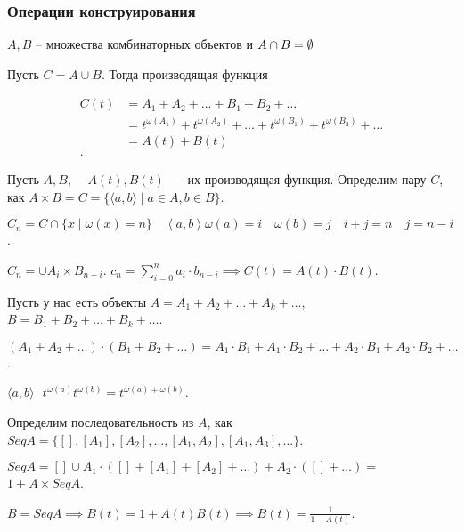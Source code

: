 \subsubsection*{Операции конструирования}
\begin{definition}

    $A, B$ -- множества комбинаторных объектов и $A\cap B = \emptyset $

    Пусть $C = A\cup B$. Тогда производящая функция

    \begin{align*}
    C(t) &= A_1 + A_2 + \ldots + B_1 + B_2 + \ldots \\
        &= t^{\omega(A_1)} + t^{\omega(A_2)} + \ldots + t^{\omega(B_1)} + t^{\omega(B_2)} + \ldots \\
        &= A(t) + B(t) \\
    .\end{align*}
\end{definition}

\begin{definition}

    Пусть $A, B$,~~ $A(t), B(t)$~--- их производящая функция. Определим пару $C$, как $A \times B = C = \{ \langle a, b \rangle \mid a \in A, b\in B \}$.

    $C_n = C \cap \{x \mid \omega(x) = n\}\quad \left<a, b \right> \omega(a) = i\quad \omega(b) = j\quad i + j = n\quad j = n-i$.

    $C_n = \cup A_i \times B_{n-i}$. $c_n = \sum_{i=0}^n a_i \cdot b_{n-i} \implies C(t) = A(t) \cdot B(t)$.
\end{definition}

\begin{note}
    Пусть у нас есть объекты $A = A_1 + A_2 + \ldots + A_k + \ldots$,\quad    $B = B_1 + B_2 + \ldots + B_k + \ldots$.

    $\left( A_1 + A_2 + \dots \right) \cdot\left( B_1 +B_2 +\dots  \right) = A_1 \cdot B_1 + A_1 \cdot B_2 + \ldots + A_2 \cdot B_1 + A_2 \cdot B_2 + \ldots $.

    $\langle a, b \rangle ~~~ t^{\omega(a)} t ^{\omega (b)} = t ^{\omega (a) + \omega (b)}$.
\end{note}

\begin{definition}
    Определим последовательность из $A$, как $Seq A = \{ [], [A_1], [A_2], \ldots, [A_1, A_2], [A_1, A_3], \ldots\}$.

    $Seq A =  [] \cup A_1 \cdot \left( [] + [A_1] + [A_2] + \dots\right) + A_2 \cdot \left( [] + \dots \right) = $
    $1 + A \times Seq A$.

    $B = Seq A \implies B(t) = 1 + A(t)B(t) \implies B(t) = \frac{1}{1 - A(t)}$.

\end{definition}


